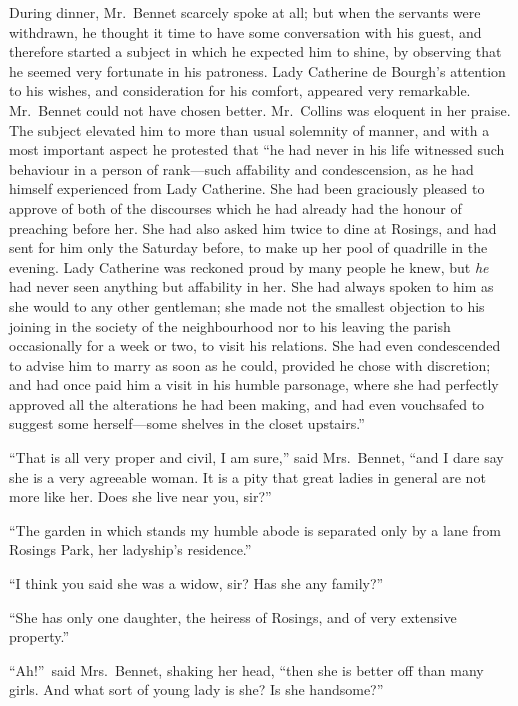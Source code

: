 \documentclass[12pt,english,oneside]{book}
\begin{document}
During dinner, Mr.\ Bennet scarcely spoke at all; but when the servants
were withdrawn, he thought it time to have some conversation with
his guest, and therefore started a subject in which he expected him
to shine, by observing that he seemed very fortunate in his patroness.
Lady Catherine de Bourgh's attention to his wishes, and consideration
for his comfort, appeared very remarkable. Mr.\ Bennet could not
have chosen better. Mr.\ Collins was eloquent in her praise. The
subject elevated him to more than usual solemnity of manner, and with
a most important aspect he protested that {}``he had never in his
life witnessed such behaviour in a person of rank\mbox{---}such affability
and condescension, as he had himself experienced from Lady Catherine.
She had been graciously pleased to approve of both of the discourses
which he had already had the honour of preaching before her. She had
also asked him twice to dine at Rosings, and had sent for him only
the Saturday before, to make up her pool of quadrille in the evening.
Lady Catherine was reckoned proud by many people he knew, but \textit{he}
had never seen anything but affability in her. She had always spoken
to him as she would to any other gentleman; she made not the smallest
objection to his joining in the society of the neighbourhood nor to
his leaving the parish occasionally for a week or two, to visit his
relations. She had even condescended to advise him to marry as soon
as he could, provided he chose with discretion; and had once paid
him a visit in his humble parsonage, where she had perfectly approved
all the alterations he had been making, and had even vouchsafed to
suggest some herself\mbox{---}some shelves in the closet upstairs.''

{}``That is all very proper and civil, I am sure,'' said Mrs.\ Bennet,
{}``and I dare say she is a very agreeable woman. It is a pity that
great ladies in general are not more like her. Does she live near
you, sir?''\ 

{}``The garden in which stands my humble abode is separated only
by a lane from Rosings Park, her ladyship's residence.''

{}``I think you said she was a widow, sir? Has she any family?''\ 

{}``She has only one daughter, the heiress of Rosings, and of very
extensive property.''

{}``Ah!''\ said Mrs.\ Bennet, shaking her head, {}``then she
is better off than many girls. And what sort of young lady is she?
Is she handsome?''\ 
\end{document}
